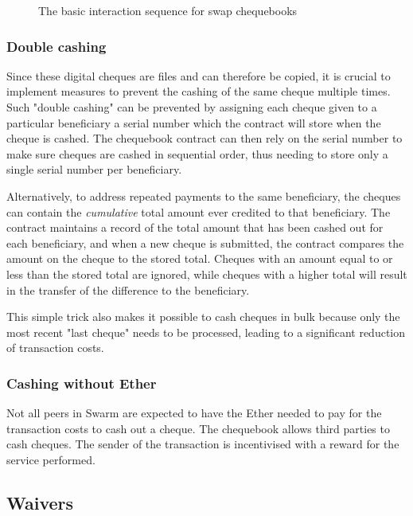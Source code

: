 \begin{figure}[htbp]
\centering

\caption[The basic interaction sequence for swap chequebooks \statusgreen]{The basic interaction sequence for swap chequebooks}
\label{fig:swap-chequebook}
\end{figure}


\subsubsection{Double cashing}

Since these digital cheques are files and can therefore be copied, it is crucial to implement measures to prevent the cashing of the same cheque multiple times. Such "double cashing" can be prevented by assigning each cheque given to a particular beneficiary a serial number which the contract will store when the cheque is cashed. The chequebook contract can then rely on the serial number to make sure cheques are cashed in sequential order, thus needing to store only a single serial number per beneficiary.

Alternatively, to address repeated payments to the same beneficiary, the cheques can contain the \emph{cumulative} total amount ever credited to that beneficiary. The contract maintains a record of the total amount that has been cashed out for each beneficiary, and when a new cheque is submitted, the contract compares the amount on the cheque to the stored total. Cheques with an amount equal to or less than the stored total are ignored, while cheques with a higher total will result in the transfer of the difference to the beneficiary.


This simple trick also makes it possible to cash cheques in bulk because only the most recent "last cheque" needs to be processed, leading to a significant reduction of transaction costs.

\subsubsection{Cashing without Ether}\label{sec:zero_eth}
Not all peers in Swarm are expected to have the Ether needed to pay for the transaction costs to cash out a cheque. The chequebook allows third parties to cash cheques. The sender of the transaction is incentivised with a reward for the service performed.

\subsection{Waivers\statusgreen}\label{sec:waiver}

